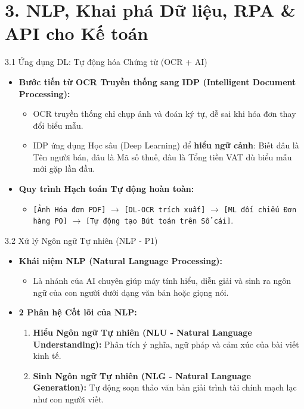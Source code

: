 \documentclass[aspectratio=169]{beamer}
\begin{document}
\section{3. NLP, Khai phá Dữ liệu, RPA \& API cho Kế toán}

\begin{frame}{3.1 Ứng dụng DL: Tự động hóa Chứng từ (OCR + AI)}
    \begin{itemize}
        \item \textbf{Bước tiến từ OCR Truyền thống sang IDP (Intelligent Document Processing):}
        \begin{itemize}
            \item OCR truyền thống chỉ chụp ảnh và đoán ký tự, dễ sai khi hóa đơn thay đổi biểu mẫu.
            \item IDP ứng dụng Học sâu (Deep Learning) để \textbf{hiểu ngữ cảnh}: Biết đâu là Tên người bán, đâu là Mã số thuế, đâu là Tổng tiền VAT dù biểu mẫu mới gặp lần đầu.
        \end{itemize}
        \item \textbf{Quy trình Hạch toán Tự động hoàn toàn:}
        \begin{itemize}
            \item \texttt{[Ảnh Hóa đơn PDF]} $\rightarrow$ \texttt{[DL-OCR trích xuất]} $\rightarrow$ \texttt{[ML đối chiếu Đơn hàng PO]} $\rightarrow$ \texttt{[Tự động tạo Bút toán trên Sổ cái]}.
        \end{itemize}
    \end{itemize}
\end{frame}

\begin{frame}{3.2 Xử lý Ngôn ngữ Tự nhiên (NLP - P1)}
    \begin{itemize}
        \item \textbf{Khái niệm NLP (Natural Language Processing):}
        \begin{itemize}
            \item Là nhánh của AI chuyên giúp máy tính hiểu, diễn giải và sinh ra ngôn ngữ của con người dưới dạng văn bản hoặc giọng nói.
        \end{itemize}
        \item \textbf{2 Phân hệ Cốt lõi của NLP:}
        \begin{enumerate}
            \item \textbf{Hiểu Ngôn ngữ Tự nhiên (NLU - Natural Language Understanding):} Phân tích ý nghĩa, ngữ pháp và cảm xúc của bài viết kinh tế.
            \item \textbf{Sinh Ngôn ngữ Tự nhiên (NLG - Natural Language Generation):} Tự động soạn thảo văn bản giải trình tài chính mạch lạc như con người viết.
        \end{enumerate}
    \end{itemize}
\end{frame}
\end{document}
